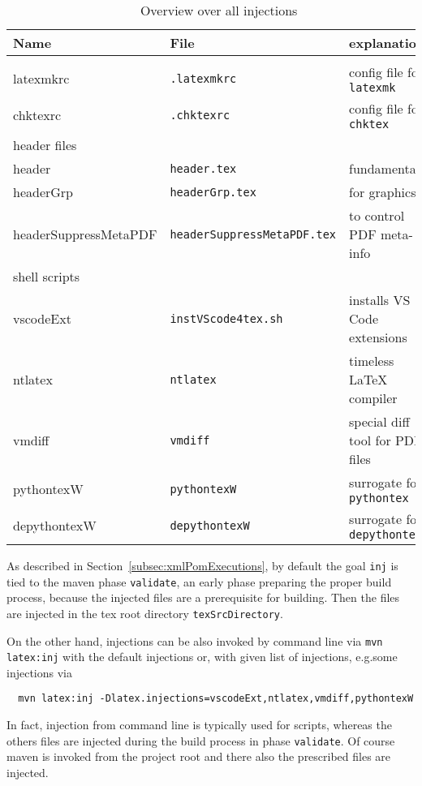 \begin{longtable}{l|ll}
  \toprule
  Name & File & explanation \\
  \midrule
  \midrule
  \endfirsthead%
  \bottomrule
  \caption{\label{tab:injections} Overview over all injections }
  \endlastfoot%
  \multicolumn{2}{l}{configuration files} \\
  \midrule
  latexmkrc             & \texttt{\footnotesize .latexmkrc}        & config file for \texttt{latexmk}   \\
  chktexrc              & \texttt{\footnotesize .chktexrc}         & config file for \texttt{chktex}         \\
  \midrule
  \multicolumn{2}{l}{header files} \\
  \midrule
  header                & \texttt{\footnotesize header.tex}        & fundamental     \\
  headerGrp             & \texttt{\footnotesize headerGrp.tex}     & for graphics      \\
 {\tiny headerSuppressMetaPDF} & \texttt{\tiny headerSuppressMetaPDF.tex} & to control PDF meta-info      \\
  \midrule
  \multicolumn{2}{l}{shell scripts} \\
  \midrule
  vscodeExt             & \texttt{\footnotesize instVScode4tex.sh} & installs VS Code extensions \\
  ntlatex               & \texttt{\footnotesize ntlatex}           & timeless \LaTeX{} compiler \\
  vmdiff                & \texttt{\footnotesize vmdiff}            & special diff tool for PDF files \\
  pythontexW            & \texttt{\footnotesize pythontexW}        & surrogate for \texttt{pythontex} \\
  depythontexW          & \texttt{\footnotesize depythontexW}      & surrogate for \texttt{depythontex} \\
  \end{longtable}


As described in Section~\ref{subsec:xmlPomExecutions}, 
by default the goal \texttt{inj} is tied to the maven phase \texttt{validate}, 
an early phase preparing the proper build process, 
because the injected files are a prerequisite for building. 
Then the files are injected in the tex root directory \texttt{texSrcDirectory}. 

On the other hand, injections can be also invoked by command line via \texttt{mvn latex:inj} 
with the default injections or, with given list of injections, 
e.g.\@ some injections via 
%
\begin{Verbatim}
  mvn latex:inj -Dlatex.injections=vscodeExt,ntlatex,vmdiff,pythontexW
\end{Verbatim}
%
In fact, injection from command line is typically used for scripts, 
whereas the others files are injected during the build process in phase \texttt{validate}. 
Of course maven is invoked from the project root 
and there also the prescribed files are injected. 

